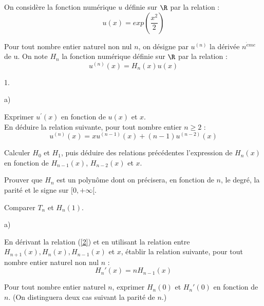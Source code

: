 \documentclass[11pt]{article}%
\begin{document}
On considère la fonction numérique $u$ définie sur $\R$ par la
relation :
\[
u(x) = exp(\dfrac{x^{2}}{2})
\]

Pour tout nombre entier naturel non nul $n$, on désigne par $u^{(n)}$
la dérivée $n^{\grave{e}me}$ de u. On note $H_{n}$ la fonction
numérique définie
sur $\R$ par la relation : 
\begin{equation}
u^{(n)}(x) = H_{n}(x)u(x) \label{2}
\end{equation}

\begin{noliste}{1.}
 \setlength{\itemsep}{4mm}
\item 

\begin{noliste}{a)}
 \setlength{\itemsep}{2mm}
\item Exprimer $u^{\prime }(x)$ en fonction de $u(x)$ et $x$.\\
En déduire la relation suivante, pour tout nombre entier $n\geq 2$
:\begin{equation}
u^{(n)}(x) = xu^{(n-1)}(x) + (n-1)u^{(n-2)}(x) \label{3}
\end{equation}

\item Calculer $H_{0}$ et $H_{1}$, puis déduire des relations
précédentes
l'expression de $H_{n}(x)$ en fonction de $H_{n-1}(x)$, $H_{n-2}(x)$ et
$x$.

\item Prouver que $H_{n}$ est un polynôme dont on précisera, en
fonction de $n$, le degré, la parité et le signe sur $[0, + \infty
\lbrack $.

\item Comparer $T_{n}$ et $H_{n}(1)$.
\end{noliste}

\item 

\begin{noliste}{a)}
 \setlength{\itemsep}{2mm}
\item En dérivant la relation (\ref{2}) et en utilisant la relation
entre $H_{n + 1}(x),H_{n}(x),H_{n-1}(x)$ et $x$, établir la relation
suivante, pour
tout nombre entier naturel non nul $n$ : 
\begin{equation}
H_{n}{\prime }(x) = nH_{n-1}(x) \label{4}
\end{equation}

\item Pour tout nombre entier naturel $n$, exprimer $H_{n}(0)$ et
$H_{n}{\prime }(0)$ en fonction de $n$. (On distinguera deux cas
suivant la
parité de $n.$)
\end{noliste}


\end{noliste}
\end{document}
